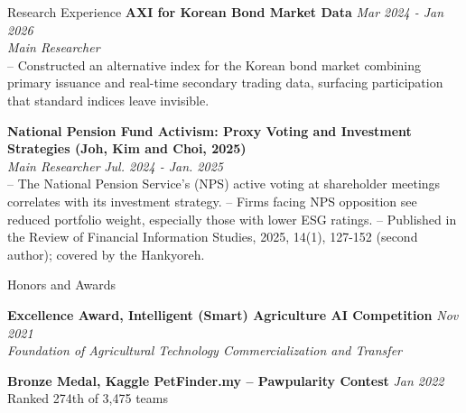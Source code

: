 \documentclass{resume} %
\begin{document}
\begin{rSection}{Research Experience}
{\bf AXI for Korean Bond Market Data} \hfill {\em Mar 2024 - Jan 2026}
\\ { \textit {Main Researcher}} \\
-- Constructed an alternative index for the Korean bond market combining primary issuance and real-time secondary trading data, surfacing participation that standard indices leave invisible.


{\bf National Pension Fund Activism: Proxy Voting and Investment Strategies (Joh, Kim and Choi, 2025)}
\\ { \textit {Main Researcher}} \hfill {\em Jul. 2024 - Jan. 2025} \\
-- The National Pension Service's (NPS) active voting at shareholder meetings correlates with its investment strategy.
-- Firms facing NPS opposition see reduced portfolio weight, especially those with lower ESG ratings.
-- Published in the Review of Financial Information Studies, 2025, 14(1), 127-152 (second author); covered by the Hankyoreh.

\end{rSection}




\begin{rSection}{Honors and Awards}

{\bf Excellence Award, Intelligent (Smart) Agriculture AI Competition} \hfill {\em Nov 2021}
\\ \textit{Foundation of Agricultural Technology Commercialization and Transfer}

{\bf Bronze Medal, Kaggle PetFinder.my -- Pawpularity Contest} \hfill {\em Jan 2022}
\\ Ranked 274th of 3,475 teams

\end{rSection}


\end{document}
